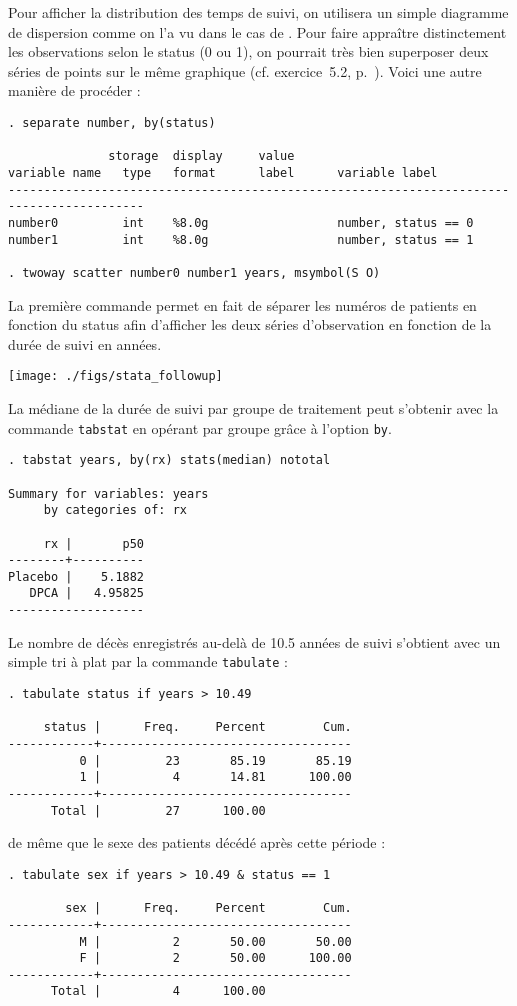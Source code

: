 Pour afficher la distribution des temps de suivi, on utilisera un simple
diagramme de dispersion comme on l'a vu dans le cas de \R. Pour faire
appraître distinctement les observations selon le status (0 ou 1), on
pourrait très bien superposer deux séries de points sur le même graphique
(cf. exercice~5.2, p.~\pageref{para:twoway}). Voici une autre manière de
procéder :
\begin{verbatim}
. separate number, by(status)

              storage  display     value
variable name   type   format      label      variable label
-----------------------------------------------------------------------------------------
number0         int    %8.0g                  number, status == 0
number1         int    %8.0g                  number, status == 1

. twoway scatter number0 number1 years, msymbol(S O)
\end{verbatim}
La première commande permet en fait de séparer les numéros de patients en
fonction du status afin d'afficher les deux séries d'observation en fonction
de la durée de suivi en années.

\texttt{[image: ./figs/stata\_followup]}

La médiane de la durée de suivi par groupe de traitement peut s'obtenir avec
la commande \texttt{tabstat} en opérant par groupe grâce à l'option
\texttt{by}. 
\begin{verbatim}
. tabstat years, by(rx) stats(median) nototal

Summary for variables: years
     by categories of: rx 

     rx |       p50
--------+----------
Placebo |    5.1882
   DPCA |   4.95825
-------------------
\end{verbatim}

Le nombre de décès enregistrés au-delà de 10.5 années de suivi s'obtient
avec un simple tri à plat par la commande \texttt{tabulate} :
\begin{verbatim}
. tabulate status if years > 10.49

     status |      Freq.     Percent        Cum.
------------+-----------------------------------
          0 |         23       85.19       85.19
          1 |          4       14.81      100.00
------------+-----------------------------------
      Total |         27      100.00
\end{verbatim}
de même que le sexe des patients décédé après cette période :
\begin{verbatim}
. tabulate sex if years > 10.49 & status == 1

        sex |      Freq.     Percent        Cum.
------------+-----------------------------------
          M |          2       50.00       50.00
          F |          2       50.00      100.00
------------+-----------------------------------
      Total |          4      100.00
\end{verbatim}

